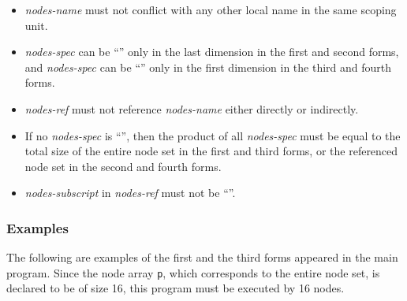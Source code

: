 \begin{itemize}
\item {\it nodes-name} must not conflict with any other local name in
      the same scoping unit.
\item {\it nodes-spec} can be ``{\tt *}'' only in the last dimension in the first and second forms, and
{\it nodes-spec} can be ``{\tt *}'' only in the first dimension in the third and fourth forms.
\item {\it nodes-ref} must not reference {\it nodes-name} either
      directly or indirectly.
\item If no {\it nodes-spec} is ``{\tt *}'', then the product
      of all {\it nodes-spec} must be equal to the total size of the
      entire node set in the first and third forms, 
      or the referenced node set in the second and fourth forms.
%
\item {\it nodes-subscript} in {\it nodes-ref} must not be ``{\tt *}''.
\end{itemize}

\subsubsection*{Examples}

The following are examples of the first and the third forms appeared in
the main program. Since the node array {\tt p}, which corresponds to the
entire node set, is declared to be of size 16, this program must be
executed by 16 nodes.



\vspace{0.5cm}

